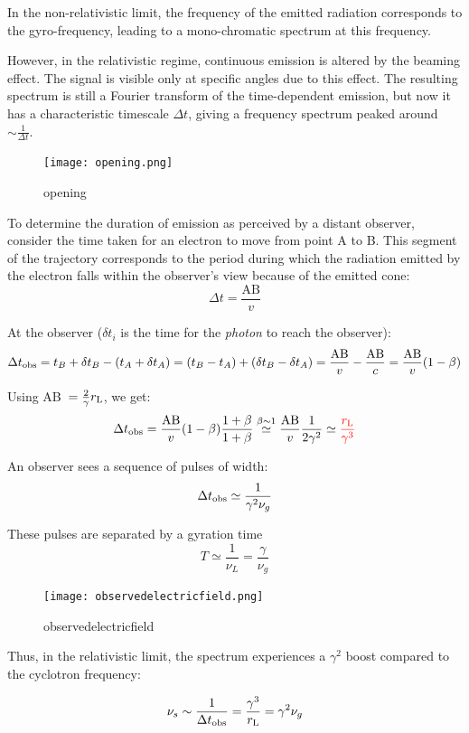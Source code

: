 In the non-relativistic limit, the frequency of the emitted radiation corresponds to the gyro-frequency, leading to a mono-chromatic spectrum at this frequency.

However, in the relativistic regime, continuous emission is altered by the beaming effect. The signal is visible only at specific angles due to this effect. The resulting spectrum is still a Fourier transform of the time-dependent emission, but now it has a characteristic timescale \(  \Delta t \), giving a frequency spectrum peaked around \( \sim \frac{1}{\Delta t} \).

\begin{figure}[t]
\centering
\texttt{[image: opening.png]}
\caption{opening}
\end{figure}

To determine the duration of emission as perceived by a distant observer, consider the time taken for an electron to move from point A to B. This segment of the trajectory corresponds to the period during which the radiation emitted by the electron falls within the observer's view because of the emitted cone:
%
\[
\Delta t = \frac{\text{AB}}{v}
\]

At the observer ($\delta t_i$ is the time for the \emph{photon} to reach the observer): 
%
\[
\Delta t_{\rm obs} = t_B + \delta t_B - (t_A  + \delta t_A) = (t_B - t_A) + (\delta t_B - \delta t_A) = \frac{\text{AB}}{v} - \frac{\text{AB}}{c} = \frac{\text{AB}}{v} (1-\beta)
\]

Using AB~$= \frac{2}{\gamma}r_{\rm L}$, we get:
%
\[
\Delta t_{\rm obs} = \frac{\text{AB}}{v} (1-\beta) \frac{1+\beta}{1+\beta} \overset{\beta \sim 1}{\simeq} \frac{\text{AB}}{v} \frac{1}{2\gamma^2} \simeq {\color{red}\frac{r_{\rm L}}{\gamma^3}}
\]

An observer sees a sequence of pulses of width:
%
\[
\Delta t_{\rm obs} \simeq \frac{1}{\gamma^2 \nu_g} %
\]

These pulses are separated by a gyration time 
%
\[
T \simeq \frac{1}{\nu_L} = \frac{\gamma}{\nu_g}
\]

\begin{figure}[t]
\centering
\texttt{[image: observedelectricfield.png]}
\caption{observedelectricfield}
\end{figure}

Thus, in the relativistic limit, the spectrum experiences a \( \gamma^2 \) boost compared to the cyclotron frequency:
%
\begin{remark}
\[
\nu_s \sim \frac{1}{\Delta t_{\rm obs}} = \frac{\gamma^3}{r_{\rm L}} = \gamma^2 \nu_g
\]
\end{remark}

